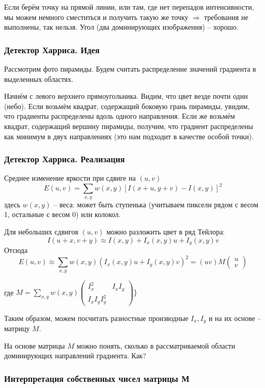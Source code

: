 \documentclass[main.tex]{subfiles}
\begin{document}
Если берём точку на прямой линии, или там, где нет перепадов интенсивности, мы можем немного сместиться и получить такую же точку $ \Rightarrow $ требования не выполнены, так нельзя.
Угол (два доминирующих изображения) -- хорошо.

\subsubsection{Детектор Харриса. Идея}
Рассмотрим фото пирамиды.
Будем считать распределение значений градиента в выделенных областях.

Начнём с левого верхнего прямоугольника.
Видим, что цвет везде почти один (небо).
Если возьмём квадрат, содержащий боковую грань пирамиды, увидим, что градиенты распределены вдоль одного направления.
Если же возьмём квадрат, содержащий вершину пирамиды, получим, что градиент распределены как минимум в двух направлениях (это нам подходит в качестве особой точки).

\subsubsection{Детектор Харриса. Реализация}
Среднее изменение яркости при сдвиге на $(u,v)$
$$ E(u,v) = \sum_{x,y} w(x,y)[I(x+u,y+v)-I(x,y)]^2 $$
здесь $w(x,y)$ -- веса: может быть ступенька (учитываем пиксели рядом с весом 1, остальные с весом 0) или колокол.

Для небольших сдвигов $ (u,v) $ можно разложить цвет в ряд Тейлора:
$$ I(u+x,v+y) \approx I(x,y) + I_x(x,y)u + I_y(x,y)v $$
Отсюда
$$ E(u,v) \approx \sum_{x,y} w(x,y) (I_x(x,y)u + I_y(x,y)v)^2 = (u v) M \begin{pmatrix} u \\ v \end{pmatrix} $$

где $M = \sum_{x,y} w(x,y) \begin{pmatrix}
I_x^2 & I_x I_y \\ I_x I_y I_y^2\end{pmatrix}\}$

Таким образом, можем посчитать разностные производные $I_x, I_y$ и на их основе -- матрицу $M$.

На основе матрицы $M$ можно понять, сколько в рассматриваемой области доминирующих направлений градиента.
Как? 

\subsubsection{Интерпретация собственных чисел матрицы М}
\end{document}
